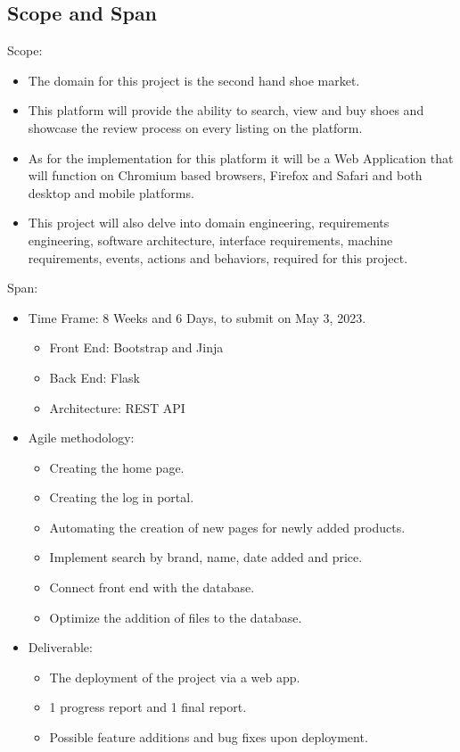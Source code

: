 \subsection{Scope and Span}
Scope:
\begin{itemize}
  \item The domain for this project is the second hand shoe market.
  \item This platform will provide the ability to search, view and buy shoes and showcase the review process on every listing on the platform.
  \item As for the implementation for this platform it will be a Web Application that will function on Chromium based browsers, Firefox and Safari and both desktop and mobile platforms.
  \item This project will also delve into domain engineering, requirements engineering, software architecture, interface requirements, machine requirements, events, actions and behaviors, required for this project.
\end{itemize}
Span:
\begin{itemize}
  \item Time Frame: 8 Weeks and 6 Days, to submit on May 3, 2023.
        \begin{itemize}
          \item Front End: Bootstrap and Jinja \cite{JinjaJinjaDocumentation}
          \item Back End: Flask\cite{WelcomeFlaskFlask}
          \item Architecture: REST API
        \end{itemize}
  \item Agile methodology:
        \begin{itemize}
          \item Creating the home page.
          \item Creating the log in portal.
          \item Automating the creation of new pages for newly added products.
          \item Implement search by brand, name, date added and price.
          \item Connect front end with the database.
          \item Optimize the addition of files to the database.
        \end{itemize}
  \item Deliverable:
        \begin{itemize}
          \item The deployment of the project via a web app.
          \item 1 progress report and 1 final report.
          \item Possible feature additions and bug fixes upon deployment.
        \end{itemize}
\end{itemize}

